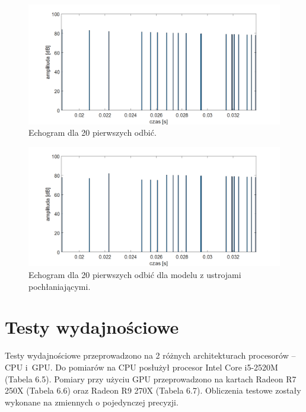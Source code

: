 \begin{figure}[H]
        \centering
                \centering
                \includegraphics[width=16cm]{echogramodbicia}
	\caption{Echogram dla 20 pierwszych odbić.}
\end{figure}

\begin{figure}[H]
        \centering
                \centering
                \includegraphics[width=16cm]{echogramodbiciazpoch}
	\caption{Echogram dla 20 pierwszych odbić dla modelu z ustrojami pochłaniającymi.}
\end{figure}


\section{Testy wydajnościowe}\label{sec:asdas2d}

Testy wydajnościowe przeprowadzono na 2 różnych architekturach procesorów – CPU i~GPU. Do pomiarów na CPU posłużył procesor Intel Core i5-2520M (Tabela 6.5). Pomiary przy użyciu GPU przeprowadzono na kartach Radeon R7 250X (Tabela 6.6) oraz Radeon R9 270X (Tabela 6.7). Obliczenia testowe zostały wykonane na zmiennych o pojedynczej precyzji.
 
